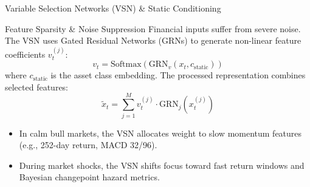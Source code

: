 \documentclass[10pt]{beamer}
\begin{document}
\begin{frame}{Variable Selection Networks (VSN) \& Static Conditioning}
  \begin{block}{Feature Sparsity \& Noise Suppression}
    Financial inputs suffer from severe noise. The VSN uses Gated Residual Networks (GRNs) to generate non-linear feature coefficients $v_t^{(j)}$:
    \begin{equation*}
      v_t = \text{Softmax}\left(\text{GRN}_v(x_t, c_{\text{static}})\right)
    \end{equation*}
    where $c_{\text{static}}$ is the asset class embedding. The processed representation combines selected features:
    \begin{equation*}
      \tilde{x}_t = \sum_{j=1}^M v_t^{(j)} \cdot \text{GRN}_j\left(x_t^{(j)}\right)
    \end{equation*}
  \end{block}
  \begin{itemize}\scriptsize
    \item In calm bull markets, the VSN allocates weight to slow momentum features (e.g., 252-day return, MACD 32/96).
    \item During market shocks, the VSN shifts focus toward fast return windows and Bayesian changepoint hazard metrics.
  \end{itemize}
\end{frame}
\end{document}
